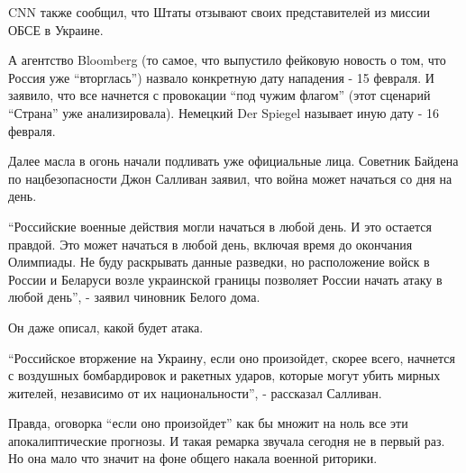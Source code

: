 CNN также сообщил, что Штаты отзывают своих представителей из миссии ОБСЕ в
Украине.

А агентство Bloomberg (то самое, что выпустило фейковую новость о том, что
Россия уже \enquote{вторглась}) назвало конкретную дату нападения - 15 февраля. И
заявило, что все начнется с провокации \enquote{под чужим флагом} (этот сценарий
\enquote{Страна} уже анализировала). Немецкий Der Spiegel называет иную дату - 16
февраля.

Далее масла в огонь начали подливать уже официальные лица. Советник Байдена по
нацбезопасности Джон Салливан заявил, что война может начаться со дня на день.

\enquote{Российские военные действия могли начаться в любой день. И это остается
правдой. Это может начаться в любой день, включая время до окончания Олимпиады.
Не буду раскрывать данные разведки, но расположение войск в России и Беларуси
возле украинской границы позволяет России начать атаку в любой день}, - заявил
чиновник Белого дома.

Он даже описал, какой будет атака. 

\enquote{Российское вторжение на Украину, если оно произойдет, скорее всего, начнется с
воздушных бомбардировок и ракетных ударов, которые могут убить мирных жителей,
независимо от их национальности}, - рассказал Салливан.

Правда, оговорка \enquote{если оно произойдет} как бы множит на ноль все эти
апокалиптические прогнозы. И такая ремарка звучала сегодня не в первый раз. Но
она мало что значит на фоне общего накала военной риторики. 

